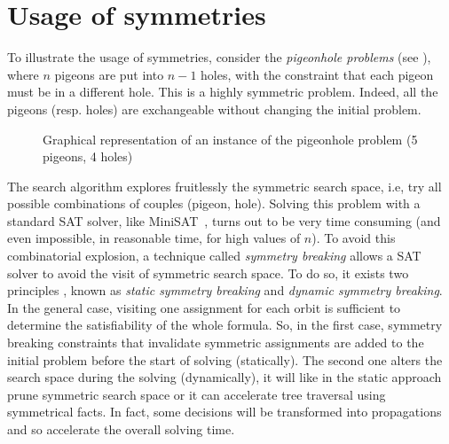  
\section{Usage of symmetries}


To illustrate the usage of symmetries, consider the \textit{pigeonhole problems} (see ), where $n$ pigeons are put into $n-1$ holes, with the constraint that each pigeon must be in a different hole. This is a
highly symmetric problem. Indeed, all the pigeons (resp. holes) are exchangeable
without changing the initial problem.

\begin{figure}[!htbp]
	\centering
	\caption{Graphical representation of an instance of the pigeonhole problem (5 pigeons, 4 holes)}
	\label{fig:hole}
\end{figure}

The search algorithm explores
fruitlessly the symmetric search space, i.e, try all possible combinations of couples (pigeon, hole).
Solving this problem with a standard SAT solver, like MiniSAT~\cite{een2003extensible},
 turns out to be very time consuming (and even impossible, in reasonable time, for high values of $n$). 
To avoid this combinatorial explosion, a technique called \emph{symmetry breaking} allows a SAT solver to avoid the visit of symmetric search space. To do so, it exists two principles , known as \emph{static symmetry breaking}
and \emph{dynamic symmetry breaking}. In the general case, visiting one assignment for each orbit is sufficient to determine the satisfiability of the whole formula.
So, in the first case, symmetry breaking constraints that invalidate symmetric assignments are added to the initial problem before the start of solving (statically). The second one alters
the search space during the solving (dynamically), it will like in the static approach prune symmetric search space or it can accelerate tree traversal using symmetrical facts.
In fact, some decisions will be transformed into propagations and so accelerate the overall solving time.
  
